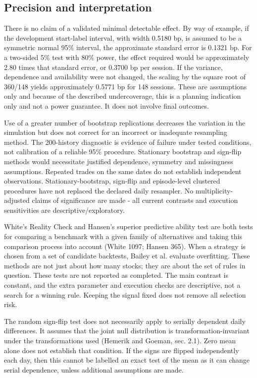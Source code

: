 \documentclass[11pt,a4paper]{article}
\begin{document}
\subsection*{Precision and interpretation}

There is no claim of a validated minimal detectable effect. By way of example, if the development start-label interval, with width 0.5180 bp, is assumed to be a symmetric normal 95\% interval, the approximate standard error is 0.1321 bp. For a two-sided 5\% test with 80\% power, the effect required would be approximately 2.80 times that standard error, or 0.3700 bp per session. If the variance, dependence and availability were not changed, the scaling by the square root of 360/148 yields approximately 0.5771 bp for 148 sessions. These are assumptions only and because of the described undercoverage, this is a planning indication only and not a power guarantee. It does not involve final outcomes.

Use of a greater number of bootstrap replications decreases the variation in the simulation but does not correct for an incorrect or inadequate resampling method. The 200-history diagnostic is evidence of failure under tested conditions, not calibration of a reliable 95\% procedure. Stationary bootstrap and sign-flip methods would necessitate justified dependence, symmetry and missingness assumptions. Repeated trades on the same dates do not establish independent observations. Stationary-bootstrap, sign-flip and episode-level clustered procedures have not replaced the declared daily resampler. No multiplicity-adjusted claims of significance are made - all current contrasts and execution sensitivities are descriptive/exploratory.

White's Reality Check and Hansen's superior predictive ability test are both tests for comparing a benchmark with a given family of alternatives and taking this comparison process into account (White 1097; Hansen 365). When a strategy is chosen from a set of candidate backtests, Bailey et al. evaluate overfitting. These methods are not just about how many stocks; they are about the set of rules in question. These tests are not reported as completed. The main contrast is constant, and the extra parameter and execution checks are descriptive, not a search for a winning rule. Keeping the signal fixed does not remove all selection risk.

The random sign-flip test does not necessarily apply to serially dependent daily differences. It assumes that the joint null distribution is transformation-invariant under the transformations used (Hemerik and Goeman, sec. 2.1). Zero mean alone does not establish that condition. If the signs are flipped independently each day, then this cannot be labelled an exact test of the mean as it can change serial dependence, unless additional assumptions are made.
\end{document}
